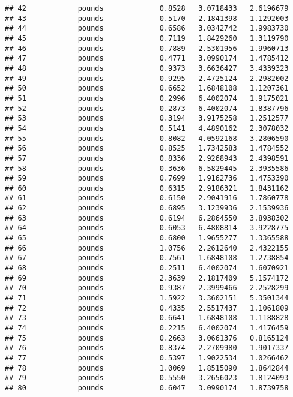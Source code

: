 \documentclass[
]{article}
\begin{document}
\begin{verbatim}
## 42            pounds             0.8528   3.0718433   2.6196679
## 43            pounds             0.5170   2.1841398   1.1292003
## 44            pounds             0.6586   3.0342742   1.9983730
## 45            pounds             0.7119   1.8429260   1.3119790
## 46            pounds             0.7889   2.5301956   1.9960713
## 47            pounds             0.4771   3.0990174   1.4785412
## 48            pounds             0.9373   3.6636427   3.4339323
## 49            pounds             0.9295   2.4725124   2.2982002
## 50            pounds             0.6652   1.6848108   1.1207361
## 51            pounds             0.2996   6.4002074   1.9175021
## 52            pounds             0.2873   6.4002074   1.8387796
## 53            pounds             0.3194   3.9175258   1.2512577
## 54            pounds             0.5141   4.4890162   2.3078032
## 55            pounds             0.8082   4.0592168   3.2806590
## 56            pounds             0.8525   1.7342583   1.4784552
## 57            pounds             0.8336   2.9268943   2.4398591
## 58            pounds             0.3636   6.5829445   2.3935586
## 59            pounds             0.7699   1.9162736   1.4753390
## 60            pounds             0.6315   2.9186321   1.8431162
## 61            pounds             0.6150   2.9041916   1.7860778
## 62            pounds             0.6895   3.1239936   2.1539936
## 63            pounds             0.6194   6.2864550   3.8938302
## 64            pounds             0.6053   6.4808814   3.9228775
## 65            pounds             0.6800   1.9655277   1.3365588
## 66            pounds             1.0756   2.2612640   2.4322155
## 67            pounds             0.7561   1.6848108   1.2738854
## 68            pounds             0.2511   6.4002074   1.6070921
## 69            pounds             2.3639   2.1817409   5.1574172
## 70            pounds             0.9387   2.3999466   2.2528299
## 71            pounds             1.5922   3.3602151   5.3501344
## 72            pounds             0.4335   2.5517437   1.1061809
## 73            pounds             0.6641   1.6848108   1.1188828
## 74            pounds             0.2215   6.4002074   1.4176459
## 75            pounds             0.2663   3.0661376   0.8165124
## 76            pounds             0.8374   2.2709980   1.9017337
## 77            pounds             0.5397   1.9022534   1.0266462
## 78            pounds             1.0069   1.8515090   1.8642844
## 79            pounds             0.5550   3.2656023   1.8124093
## 80            pounds             0.6047   3.0990174   1.8739758

\end{verbatim}
\end{document}
